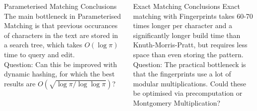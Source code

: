 \documentclass[ %
                    author={Dominic Moylett},
                supervisor={Dr. Raphael Clifford, Dr. Markus Jalsenius and Dr. Benjamin Sach},
                     title={An Empirical Analysis of Data Streaming Algorithms},
                  subtitle={},
                    degree={MEng},
                      year={2014} ]{poster}
\begin{document}
\begin{frame}{}
\begin{columns}[t]
  \begin{column}{0.422\linewidth}
  \begin{block}{\Large Parameterised Matching Conclusions}
  The main bottleneck in Parameterised Matching is that previous occurances of characters in the text are stored in a search tree, which takes $O(\log\pi)$ time to query and edit.\\
  \vspace{\baselineskip}
  Question: Can this be improved with dynamic hashing, for which the best results are $O(\sqrt{\log\pi/\log\log\pi})$?
  \end{block}
  \end{column}
  \begin{column}{0.422\linewidth}
  \begin{block}{\Large Exact Matching Conclusions}
  Exact matching with Fingerprints takes 60-70 times longer per character and a significantly longer build time than Knuth-Morris-Pratt, but requires less space than even storing the pattern.\\
  \vspace{\baselineskip}
  Question: The practical bottleneck is that the fingerprints use a lot of modular multiplications. Could these be optimised via precomputation or Montgomery Multiplication?
  \end{block}
  \end{column}
\end{columns}

\vfill

\end{frame}

\end{document}
